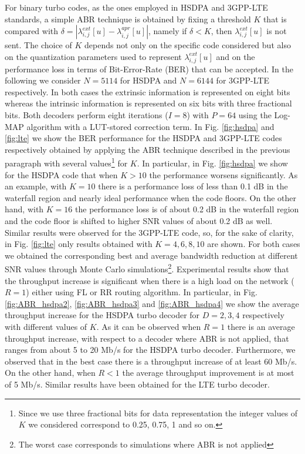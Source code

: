 \documentclass[10pt,twocolumn,journal]{IEEEtran}
\begin{document}
For binary turbo codes, as the ones employed in HSDPA and 3GPP-LTE standards, a simple ABR technique is obtained 
by fixing a threshold $K$ that is compared with $\delta = |\lambda^{ext}_{i,j}[u] - \lambda^{apr}_{i,j}[u]|$, namely  
if $\delta<K$, then $\lambda^{ext}_{i,j}[u]$ is not sent. The choice of $K$ depends not only on the specific code 
considered but also on the quantization parameters used to represent $\lambda^{ext}_{i,j}[u]$ and on the performance 
loss in terms of Bit-Error-Rate (BER) that can be accepted. In the following we consider $N=5114$ for HSDPA and 
$N=6144$ for 3GPP-LTE respectively. In both cases the extrinsic information is represented on eight bits whereas 
the intrinsic information is represented on six bits with three fractional bits. Both decoders perform eight iterations 
($I=8$) with $P=64$ using the Log-MAP algorithm \cite{robertson_ETT97} with a LUT-stored correction term. 
In Fig. \ref{fig:hsdpa} and \ref{fig:lte} we show the BER performance for the HSDPA and 3GPP-LTE codes 
respectively obtained by applying the ABR technique described in the previous paragraph with several 
values\footnote{Since we use three fractional bits for data representation the integer values of $K$ we 
considered correspond to 0.25, 0.75, 1 and so on.} for $K$. 
In particular, in Fig. \ref{fig:hsdpa} we show for the HSDPA code that when $K>10$ the performance 
worsens significantly. As an example, with $K=10$ there is a performance loss of less than 0.1 dB in the waterfall 
region and nearly ideal performance when the code floors. 
On the other hand, with $K=16$ the performance loss is of about 0.2 dB in the waterfall region and the code floor is 
shifted to higher SNR values of about 0.2 dB as well.
Similar results were observed for the 3GPP-LTE code, so, for the sake of clarity, in Fig. 
\ref{fig:lte} only results obtained with $K=4, 6, 8, 10$ are shown. 
For both cases we obtained the corresponding best and average bandwidth reduction at different SNR values through 
Monte Carlo simulations\footnote{The worst case corresponds to simulations where ABR is not applied}.
Experimental results show that the throughput increase is significant when there is a high load on the network ($R=1$) 
either using FL or RR routing algorithm. 
In particular, in Fig. \ref{fig:ABR_hsdpa2}, \ref{fig:ABR_hsdpa3} and \ref{fig:ABR_hsdpa4} we show the average 
throughput increase for the HSDPA turbo decoder for $D=2,3,4$ respectively with different values of $K$. 
As it can be observed 
when $R=1$ there is an average throughput increase, with respect to a decoder where ABR is not applied,  
that ranges from about 5 to 20 Mb/s for the HSDPA turbo decoder. 
Furthermore, we observed that in the best case there is a throughput increase of at least 60 Mb/s. 
On the other hand, when $R<1$ the average throughput improvement is at most of 5 Mb/s.
Similar results have been obtained for the LTE turbo decoder.
\end{document}
